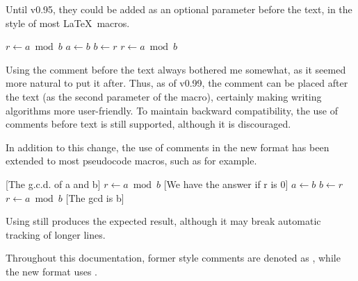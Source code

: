 \documentclass[a4paper, 11pt]{article}
\begin{document}
Until  v0.95, they could be added as an optional parameter before the text, in the style of most \LaTeX\ macros.

\begingroup
{}
\begin{tcblisting}{}
    \begin{algorithmic}[1]
            \State $r\gets a\bmod b$
                \State $a\gets b$
                \State $b\gets r$
                \State $r\gets a\bmod b$
            \EndWhile
        \EndProcedure
    \end{algorithmic}
\end{tcblisting}
\endgroup

Using the comment before the text always bothered me somewhat, as it seemed more natural to put it after. Thus, as of v0.99, the comment can be placed after the text (as the second parameter of the macro), certainly making writing algorithms more user-friendly. To maintain backward compatibility, the use of comments before text is still supported, although it is discouraged.

In addition to this change, the use of comments in the new format has been extended to most pseudocode macros, such as  for example.

\begingroup
{}
\begin{tcblisting}{}
    \begin{algorithmic}[1]
        [The g.c.d. of a and b]  %
            \State $r\gets a\bmod b$
            [We have the answer if r is 0]  %
                \State $a\gets b$
                \State $b\gets r$
                \State $r\gets a\bmod b$
            [The gcd is b]  %
        \EndProcedure
    \end{algorithmic}
\end{tcblisting}
\endgroup

Using  still produces the expected result, although it may break automatic tracking of longer lines.

Throughout this documentation, former style comments are denoted as , while the new format uses .
\end{document}
